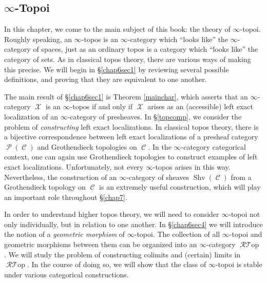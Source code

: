 \documentclass{report}[10pt, final]
\DeclareMathOperator{\Shv}{Shv}
\DeclareMathOperator{\RGeom}{\mathcal{R}{\mathcal T}op}
\DeclareMathOperator{\calC}{\mathcal{C}}
\DeclareMathOperator{\calX}{\mathcal{X}}
\DeclareMathOperator{\calP}{\mathcal{P}}
\theoremstyle{definition}
\begin{document}
\begin{chapter2onwards}






\chapter{$\infty$-Topoi}\label{chap6}

\setcounter{theorem}{0}
\setcounter{subsection}{0}

In this chapter, we come to the main subject of this book: the theory of $\infty$-topoi.
Roughly speaking, an $\infty$-topos is an $\infty$-category which ``looks like'' the $\infty$-category of spaces, just as an ordinary topos is a category which ``looks like'' the category of sets. As in classical topos theory, there are various ways of making this precise. We will begin in \S \ref{chap6sec1} by reviewing several possible definitions, and proving that they are equivalent to one another.

The main result of \S \ref{chap6sec1} is Theorem \ref{mainchar}, which asserts that an $\infty$-category $\calX$ is an $\infty$-topos if and only if $\calX$ arises as an (accessible) left exact localization of an $\infty$-category of presheaves. In \S \ref{topcomp}, we consider the problem of {\em constructing} left exact localizations. In classical topos theory, there is a bijective correspondence between left exact localizations of a presheaf category $\calP(\calC)$ and Grothendieck topologies on $\calC$. In the $\infty$-category categorical context, one can again use Grothendieck topologies to construct examples of left exact localizations. 
Unfortunately, not every $\infty$-topos arises in this way. Nevertheless, the construction of an $\infty$-category of sheaves $\Shv(\calC)$ from a Grothendieck topology on $\calC$ is an extremely useful construction, which will play an important role throughout \S \ref{chap7}.

In order to understand higher topos theory, we will need to consider $\infty$-topoi not only individually, but in relation to one another. In \S \ref{chap6sec4} we will introduce the notion of a {\em geometric morphism} of $\infty$-topoi. The collection of all $\infty$-topoi and geometric morphisms between them can be organized into an $\infty$-category $\RGeom$. We will study the problem of constructing colimits and (certain) limits in $\RGeom$. In the course of doing so, we will show that the class of $\infty$-topoi is stable under various categorical constructions.


\end{chapter2onwards}
\end{document}
